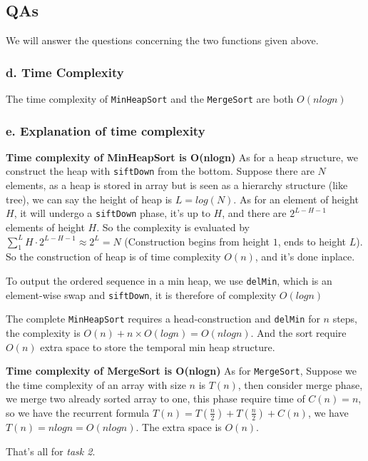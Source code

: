 \subsection{QAs}

We will answer the questions concerning the two functions given above.

\subsubsection*{d. Time Complexity}
The time complexity of \verb|MinHeapSort| and the \verb|MergeSort| are both $O(nlogn)$

\subsubsection*{e. Explanation of time complexity}
\textbf{Time complexity of MinHeapSort is O(nlogn)} As for a heap structure, we construct the heap with \verb|siftDown| from the bottom. Suppose there are $N$ elements, as a heap is stored in array but is seen as a hierarchy structure (like tree), we can say the height of heap is $L = log(N)$. As for an element of height $H$, it will undergo a \verb|siftDown| phase, it's up to $H$, and there are $2^{L-H-1}$ elements of height $H$. So the complexity is evaluated by $\sum_{1}^{L} H \cdot 2^{L-H-1} \approx 2^{L} = N$ (Construction begins from height $1$, ends to height $L$). So the construction of heap is of time complexity $O(n)$, and it's done inplace.

To output the ordered sequence in a min heap, we use \verb|delMin|, which is an element-wise swap and \verb|siftDown|, it is therefore of complexity $O(logn)$

The complete \verb|MinHeapSort| requires a head-construction and \verb|delMin| for $n$ steps, the complexity is $O(n) + n \times O(logn) = O(nlogn)$. And the sort require $O(n)$ extra space to store the temporal min heap structure.

\textbf{Time complexity of MergeSort is O(nlogn)} As for \verb|MergeSort|, Suppose we the time complexity of an array with size $n$ is $T(n)$, then consider merge phase, we merge two already sorted array to one, this phase require time of $C(n) = n$, so we have the recurrent formula $T(n) = T(\frac{n}{2}) + T(\frac{n}{2}) + C(n)$, we have $T(n) = nlogn = O(nlogn)$. The extra space is $O(n)$.

That's all for \textit{task 2}.